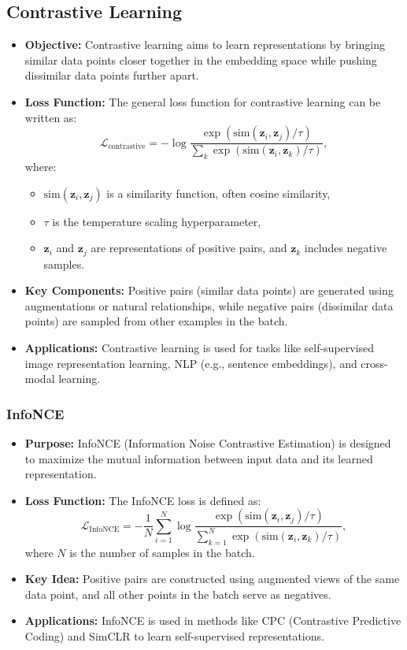 \documentclass[12pt,a4paper]{article}
\begin{document}
\subsection{Contrastive Learning}
\begin{itemize}
    \item \textbf{Objective:} Contrastive learning aims to learn representations by bringing similar data points closer together in the embedding space while pushing dissimilar data points further apart.
    \item \textbf{Loss Function:} The general loss function for contrastive learning can be written as:
    \[
    \mathcal{L}_{\text{contrastive}} = -\log \frac{\exp(\text{sim}(\mathbf{z}_i, \mathbf{z}_j) / \tau)}{\sum_{k} \exp(\text{sim}(\mathbf{z}_i, \mathbf{z}_k) / \tau)},
    \]
    where:
    \begin{itemize}
        \item \(\text{sim}(\mathbf{z}_i, \mathbf{z}_j)\) is a similarity function, often cosine similarity,
        \item \(\tau\) is the temperature scaling hyperparameter,
        \item \(\mathbf{z}_i\) and \(\mathbf{z}_j\) are representations of positive pairs, and \(\mathbf{z}_k\) includes negative samples.
    \end{itemize}
    \item \textbf{Key Components:} Positive pairs (similar data points) are generated using augmentations or natural relationships, while negative pairs (dissimilar data points) are sampled from other examples in the batch.
    \item \textbf{Applications:} Contrastive learning is used for tasks like self-supervised image representation learning, NLP (e.g., sentence embeddings), and cross-modal learning.
\end{itemize}

\subsubsection{InfoNCE}
\begin{itemize}
    \item \textbf{Purpose:} InfoNCE (Information Noise Contrastive Estimation) is designed to maximize the mutual information between input data and its learned representation.
    \item \textbf{Loss Function:} The InfoNCE loss is defined as:
    \[
    \mathcal{L}_{\text{InfoNCE}} = -\frac{1}{N} \sum_{i=1}^{N} \log \frac{\exp(\text{sim}(\mathbf{z}_i, \mathbf{z}_j) / \tau)}{\sum_{k=1}^{N} \exp(\text{sim}(\mathbf{z}_i, \mathbf{z}_k) / \tau)},
    \]
    where \(N\) is the number of samples in the batch.
    \item \textbf{Key Idea:} Positive pairs are constructed using augmented views of the same data point, and all other points in the batch serve as negatives.
    \item \textbf{Applications:} InfoNCE is used in methods like CPC (Contrastive Predictive Coding) and SimCLR to learn self-supervised representations.

\end{itemize}
\end{document}
